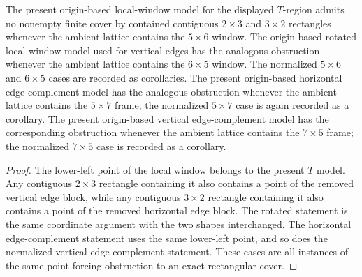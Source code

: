 \begin{lemma}%
    \label{lem:peps_normalSquareRegionT_no_five_by_six_cover}
    \leanok
    The present origin-based local-window model for the displayed $T$-region
    admits no nonempty finite cover by contained contiguous $2\times3$ and
    $3\times2$ rectangles whenever the ambient lattice contains the
    $5\times6$ window. The origin-based rotated local-window model used for
    vertical edges has the analogous obstruction whenever the ambient lattice
    contains the $6\times5$ window. The normalized $5\times6$ and
    $6\times5$ cases are recorded as corollaries. The present origin-based
    horizontal edge-complement model has the analogous obstruction whenever
    the ambient lattice contains the $5\times7$ frame; the normalized
    $5\times7$ case is again recorded as a corollary. The present
    origin-based vertical edge-complement model has the corresponding
    obstruction whenever the ambient lattice contains the $7\times5$ frame;
    the normalized $7\times5$ case is recorded as a corollary.
\end{lemma}
\begin{proof}\leanok
    The lower-left point of the local window belongs to the present $T$
    model. Any contiguous $2\times3$ rectangle containing it also contains
    a point of the removed vertical edge block, while any contiguous
    $3\times2$ rectangle containing it also contains a point of the removed
    horizontal edge block. The rotated statement is the same coordinate
    argument with the two shapes interchanged. The horizontal
    edge-complement statement uses the same lower-left point, and so does the
    normalized vertical edge-complement statement. These cases are all
    instances of the same point-forcing obstruction to an exact rectangular
    cover.
\end{proof}

